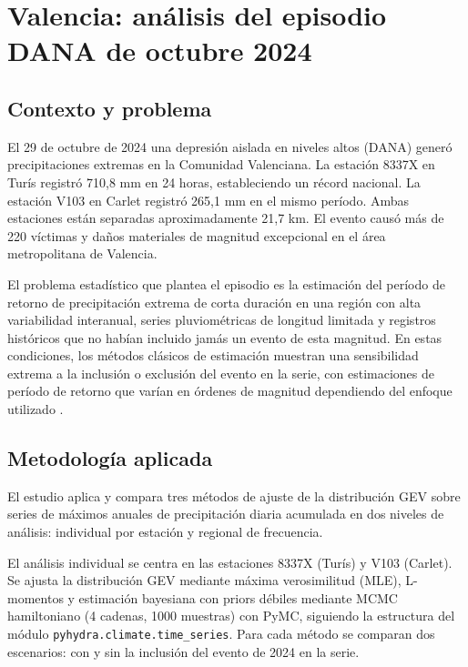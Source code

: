 \clearpage
\section{Valencia: análisis del episodio DANA de octubre 2024}
\label{sec:caso_valencia}

\subsection{Contexto y problema}

El 29 de octubre de 2024 una depresión aislada en niveles altos (DANA) generó precipitaciones extremas en la Comunidad Valenciana. La estación 8337X en Turís registró 710,8 mm en 24 horas, estableciendo un récord nacional. La estación V103 en Carlet registró 265,1 mm en el mismo período. Ambas estaciones están separadas aproximadamente 21,7 km. El evento causó más de 220 víctimas y daños materiales de magnitud excepcional en el área metropolitana de Valencia.

El problema estadístico que plantea el episodio es la estimación del período de retorno de precipitación extrema de corta duración en una región con alta variabilidad interanual, series pluviométricas de longitud limitada y registros históricos que no habían incluido jamás un evento de esta magnitud. En estas condiciones, los métodos clásicos de estimación muestran una sensibilidad extrema a la inclusión o exclusión del evento en la serie, con estimaciones de período de retorno que varían en órdenes de magnitud dependiendo del enfoque utilizado \parencite{deljesus2025jia}.

\subsection{Metodología aplicada}

El estudio aplica y compara tres métodos de ajuste de la distribución GEV sobre series de máximos anuales de precipitación diaria acumulada en dos niveles de análisis: individual por estación y regional de frecuencia.

El análisis individual se centra en las estaciones 8337X (Turís) y V103 (Carlet). Se ajusta la distribución GEV mediante máxima verosimilitud (MLE), L-momentos y estimación bayesiana con priors débiles mediante MCMC hamiltoniano (4 cadenas, 1000 muestras) con PyMC, siguiendo la estructura del módulo \texttt{pyhydra.climate.time\_series}. Para cada método se comparan dos escenarios: con y sin la inclusión del evento de 2024 en la serie.


